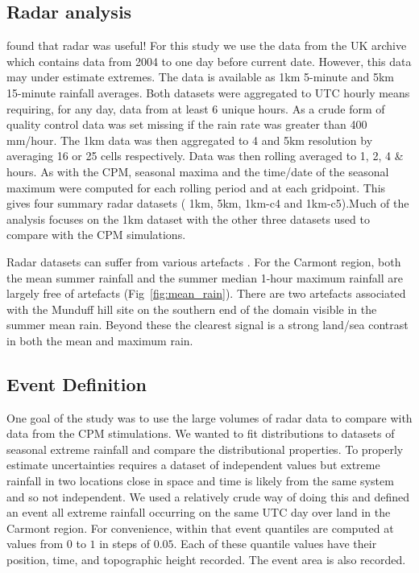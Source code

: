 \documentclass[11pt,a4paper]{article}
\begin{document}
\subsection{Radar analysis}
\cite{saltikoff2019radar_climate} found that radar was useful! For this study we use the data from the UK archive which contains data from 2004 to one day before current date\parencite{radar_data}. However, this data may under estimate extremes\parencite{harrison2000nimrod}. The data is available  as  1km 5-minute and 5km 15-minute rainfall averages.  Both datasets  were aggregated to UTC hourly means requiring, for any day, data from at least 6  unique hours. As a crude form of quality control data was set missing if the rain rate was greater than 400 mm/hour.  The 1km data was then aggregated to 4 and 5km resolution by averaging 16 or 25 cells respectively. Data was then rolling averaged to 1, 2, 4 \& hours. As with the CPM,  seasonal maxima and the time/date of the seasonal maximum were computed for each rolling period and at each gridpoint. This gives four summary radar datasets ( 1km, 5km,  1km-c4 and  1km-c5).Much of the analysis focuses on the 1km dataset with the  other three datasets used to compare with the CPM simulations. 

Radar datasets can suffer from various artefacts \parencite{Overeem2023euradclim}.
For the Carmont region, both the mean summer rainfall and the summer median 1-hour maximum rainfall are largely free of artefacts (Fig~\ref{fig:mean_rain}). There are two artefacts associated with the Munduff hill site on the southern end of the domain visible in the summer mean rain. Beyond these the clearest signal is a strong land/sea contrast in both the mean and maximum rain. 

\subsection{Event Definition}

One goal of the study was to use the large volumes of radar data to compare with data from the CPM stimulations. We  wanted  to fit distributions to  datasets of seasonal extreme rainfall and compare the distributional properties. To properly estimate uncertainties requires a dataset of independent values but extreme rainfall in two locations close in space and time is likely from the same system and so not independent. We used a relatively crude way of doing this and defined an event  all extreme rainfall occurring on the same UTC day over land in the Carmont region.  For convenience, within that event quantiles are computed at values from $0$ to $1$ in steps of $0.05$. Each of these quantile values have their position, time, and topographic height recorded. The event area is also recorded.  
\end{document}

